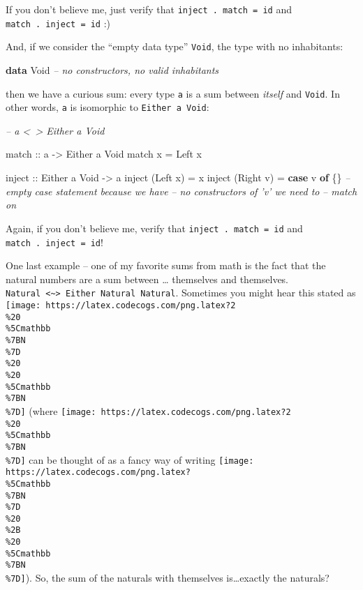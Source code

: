 \documentclass[]{article}
\newenvironment{Shaded}{}{}
\newcommand{\CommentTok}[1]{\textcolor[rgb]{0.38,0.63,0.69}{\textit{#1}}}
\newcommand{\DataTypeTok}[1]{\textcolor[rgb]{0.56,0.13,0.00}{#1}}
\newcommand{\FunctionTok}[1]{\textcolor[rgb]{0.02,0.16,0.49}{#1}}
\newcommand{\KeywordTok}[1]{\textcolor[rgb]{0.00,0.44,0.13}{\textbf{#1}}}
\newcommand{\NormalTok}[1]{#1}
\newcommand{\OtherTok}[1]{\textcolor[rgb]{0.00,0.44,0.13}{#1}}
\begin{document}
If you don't believe me, just verify that \texttt{inject\ .\ match\ =\ id} and
\texttt{match\ .\ inject\ =\ id} :)

And, if we consider the ``empty data type'' \texttt{Void}, the type with no
inhabitants:

\begin{Shaded}
\begin{Highlighting}[]
\KeywordTok{data} \DataTypeTok{Void}           \CommentTok{-- no constructors, no valid inhabitants}
\end{Highlighting}
\end{Shaded}

then we have a curious sum: every type \texttt{a} is a sum between \emph{itself}
and \texttt{Void}. In other words, \texttt{a} is isomorphic to
\texttt{Either\ a\ Void}:

\begin{Shaded}
\begin{Highlighting}[]
\CommentTok{-- a <~> Either a Void}

\OtherTok{match ::}\NormalTok{ a }\OtherTok{->} \DataTypeTok{Either}\NormalTok{ a }\DataTypeTok{Void}
\NormalTok{match x }\FunctionTok{=} \DataTypeTok{Left}\NormalTok{ x}

\OtherTok{inject ::} \DataTypeTok{Either}\NormalTok{ a }\DataTypeTok{Void} \OtherTok{->}\NormalTok{ a}
\NormalTok{inject (}\DataTypeTok{Left}\NormalTok{  x) }\FunctionTok{=}\NormalTok{ x}
\NormalTok{inject (}\DataTypeTok{Right}\NormalTok{ v) }\FunctionTok{=} \KeywordTok{case}\NormalTok{ v }\KeywordTok{of}
\NormalTok{                    \{\}  }\CommentTok{-- empty case statement because we have}
                        \CommentTok{-- no constructors of 'v' we need to}
                        \CommentTok{-- match on}
\end{Highlighting}
\end{Shaded}

Again, if you don't believe me, verify that \texttt{inject\ .\ match\ =\ id} and
\texttt{match\ .\ inject\ =\ id}!

One last example -- one of my favorite sums from math is the fact that the
natural numbers are a sum between \ldots{} themselves and themselves.
\texttt{Natural\ \textless{}\textasciitilde{}\textgreater{}\ Either\ Natural\ Natural}.
Sometimes you might hear this stated as
\texttt{[image: https://latex.codecogs.com/png.latex?2\\\%20\\\%5Cmathbb\\\%7BN\\\%7D\\\%20~\\\%20\\\%5Cmathbb\\\%7BN\\\%7D]}
(where
\texttt{[image: https://latex.codecogs.com/png.latex?2\\\%20\\\%5Cmathbb\\\%7BN\\\%7D]}
can be thought of as a fancy way of writing
\texttt{[image: https://latex.codecogs.com/png.latex?\\\%5Cmathbb\\\%7BN\\\%7D\\\%20\\\%2B\\\%20\\\%5Cmathbb\\\%7BN\\\%7D]}).
So, the sum of the naturals with themselves is\ldots{}exactly the naturals?
\end{document}
